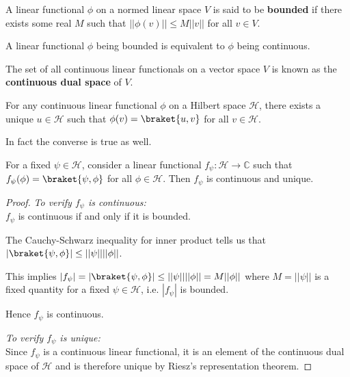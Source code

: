\begin{defn}
A linear functional $\phi$ on a normed linear space $V$ is said to be \textbf{bounded} if there exists some real $M$ such that $|| \phi(v)|| \leq M ||v||$ for all $v \in V$. 
\end{defn}

\begin{result}
A linear functional $\phi$ being bounded is equivalent to $\phi$ being continuous.
\end{result}

\begin{defn}
    The set of all continuous linear functionals on a vector space $V$ is known as the \textbf{continuous dual space} of $V$.
\end{defn}

\begin{result}
    For any continuous linear functional $\phi$ on a Hilbert space $\mathcal{H}$, there exists a unique $u \in \mathcal{H}$ such that $\phi(v) = \braket{u,v}$ for all $v \in \mathcal{H}$. 
\end{result}

In fact the converse is true as well.

\begin{prop}
\label{innerproduct:continuous}
For a fixed $\psi \in \mathcal{H}$, consider a linear functional $f_\psi : \mathcal{H} \to \mathbb{C}$ such that $f_\psi(\phi) = \braket{\psi,\phi}$ for all $\phi \in \mathcal{H}$. Then $f_\psi$ is continuous and unique. 
\end{prop}
\begin{proof}
    \textit{To verify $f_\psi$ is continuous:} \\
    $f_\psi$ is continuous if and only if it is bounded. 

    The Cauchy-Schwarz inequality for inner product tells us that $|\braket{\psi,\phi}| \leq ||\psi||||\phi||$.

    This implies $|f_\psi| = |\braket{\psi,\phi}| \leq ||\psi|| ||\phi|| = M ||\phi||$ where $M = ||\psi||$ is a fixed quantity for a fixed $\psi \in \mathcal{H}$, i.e. $|f_\psi|$ is bounded.

    Hence $f_\psi$ is continuous. 

    \textit{To verify $f_\psi$ is unique:} \\
    
    Since $f_\psi$ is a continuous linear functional, it is an element of the continuous dual space of $\mathcal{H}$ and is therefore unique by Riesz's representation theorem.
\end{proof}

